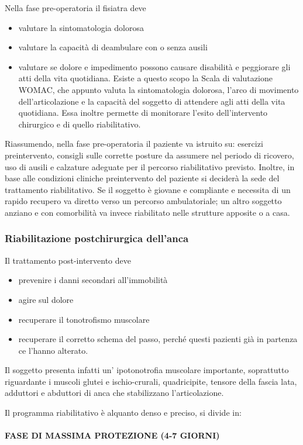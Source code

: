 Nella fase pre-operatoria il fisiatra deve
\begin{itemize}
\item valutare la sintomatologia dolorosa
\item valutare la capacità di deambulare con o senza ausili
\item valutare se dolore e impedimento possono causare disabilità e peggiorare gli atti della vita quotidiana. Esiste a questo scopo la Scala di valutazione WOMAC, che appunto valuta la sintomatologia dolorosa, l'arco di movimento dell'articolazione e la capacità del soggetto di attendere agli atti della vita quotidiana. Essa inoltre
permette di monitorare l'esito dell'intervento chirurgico e di quello riabilitativo.
\end{itemize}
Riassumendo, nella fase pre-operatoria il paziente va istruito su:
esercizi preintervento, consigli sulle corrette posture da assumere nel periodo di ricovero, uso di ausili e calzature adeguate per il percorso riabilitativo previsto. Inoltre, in base alle condizioni cliniche preintervento del paziente si deciderà la sede del trattamento riabilitativo. Se il soggetto è giovane e compliante e necessita di un rapido recupero va diretto verso un percorso ambulatoriale; un altro soggetto anziano e con comorbilità va invece riabilitato nelle strutture apposite o a casa.

\subsubsection{Riabilitazione postchirurgica dell'anca}
Il trattamento post-intervento deve
\begin{itemize}
\item prevenire i danni secondari all'immobilità
\item agire sul dolore
\item recuperare il tonotrofismo muscolare
\item recuperare il corretto schema del passo, perché questi pazienti già in partenza ce l'hanno alterato.
\end{itemize}

Il soggetto presenta infatti un' ipotonotrofia muscolare importante, soprattutto riguardante i muscoli glutei e ischio-crurali, quadricipite, tensore della fascia lata, adduttori e abduttori di anca che stabilizzano l'articolazione.

Il programma riabilitativo è alquanto denso e preciso, si divide in:

\paragraph{FASE DI MASSIMA PROTEZIONE (4-7 GIORNI)}

